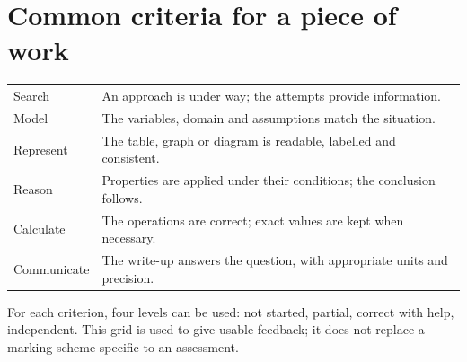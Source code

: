 \section*{Common criteria for a piece of work}
\begin{center}\small{}\begin{tabularx}{\linewidth}{l X}
Search&An approach is under way; the attempts provide information.\\
Model&The variables, domain and assumptions match the situation.\\
Represent&The table, graph or diagram is readable, labelled and consistent.\\
Reason&Properties are applied under their conditions; the conclusion follows.\\
Calculate&The operations are correct; exact values are kept when necessary.\\
Communicate&The write-up answers the question, with appropriate units and precision.
\end{tabularx}\end{center}
For each criterion, four levels can be used: not started, partial, correct with help, independent. This grid is used to give usable feedback; it does not replace a marking scheme specific to an assessment.

